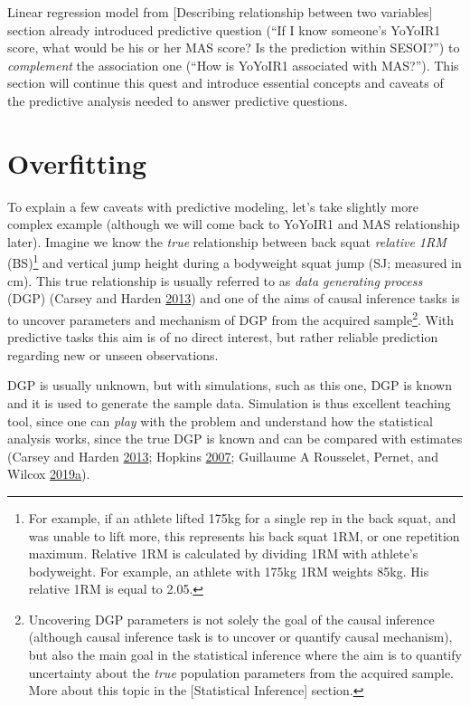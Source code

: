 \documentclass[
]{book}
\begin{document}
Linear regression model from {[}Describing relationship between two variables{]} section already introduced predictive question (``If I know someone's YoYoIR1 score, what would be his or her MAS score? Is the prediction within SESOI?'') to \emph{complement} the association one (``How is YoYoIR1 associated with MAS?''). This section will continue this quest and introduce essential concepts and caveats of the predictive analysis needed to answer predictive questions.

\hypertarget{overfitting}{%
\section{Overfitting}\label{overfitting}}

To explain a few caveats with predictive modeling, let's take slightly more complex example (although we will come back to YoYoIR1 and MAS relationship later). Imagine we know the \emph{true} relationship between back squat \emph{relative 1RM} (BS)\footnote{For example, if an athlete lifted 175kg for a single rep in the back squat, and was unable to lift more, this represents his back squat 1RM, or one repetition maximum. Relative 1RM is calculated by dividing 1RM with athlete's bodyweight. For example, an athlete with 175kg 1RM weights 85kg. His relative 1RM is equal to 2.05.} and vertical jump height during a bodyweight squat jump (SJ; measured in cm). This true relationship is usually referred to as \emph{data generating process} (DGP) (Carsey and Harden \protect\hyperlink{ref-carseyMonteCarloSimulation2013}{2013}) and one of the aims of causal inference tasks is to uncover parameters and mechanism of DGP from the acquired sample\footnote{Uncovering DGP parameters is not solely the goal of the causal inference (although causal inference task is to uncover or quantify causal mechanism), but also the main goal in the statistical inference where the aim is to quantify uncertainty about the \emph{true} population parameters from the acquired sample. More about this topic in the {[}Statistical Inference{]} section.}. With predictive tasks this aim is of no direct interest, but rather reliable prediction regarding new or unseen observations.

DGP is usually unknown, but with simulations, such as this one, DGP is known and it is used to generate the sample data. Simulation is thus excellent teaching tool, since one can \emph{play} with the problem and understand how the statistical analysis works, since the true DGP is known and can be compared with estimates (Carsey and Harden \protect\hyperlink{ref-carseyMonteCarloSimulation2013}{2013}; Hopkins \protect\hyperlink{ref-hopkinsUnderstandingStatisticsUsing2007}{2007}; Guillaume A Rousselet, Pernet, and Wilcox \protect\hyperlink{ref-rousseletPracticalIntroductionBootstrap2019}{2019}\protect\hyperlink{ref-rousseletPracticalIntroductionBootstrap2019}{a}).
\end{document}
